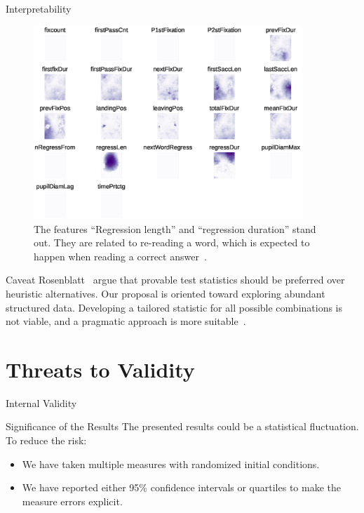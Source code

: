\documentclass[10pt,notes]{beamer}
\begin{document}
\begin{frame}{Interpretability}
    \begin{figure}
        \centering
        \includegraphics[trim=5pt 75pt 5pt 5pt,clip,width=0.9\textwidth]{eye_features.eps}
        \caption{
            The features ``Regression length'' and ``regression duration'' stand out.
            They are related to re-reading a word, which is expected to happen when reading a correct answer~\cite{salojarvi2005inferring}.
        }
    \end{figure}

\end{frame}


\begin{frame}{Caveat}
    Rosenblatt~\cite{rosenblatt2019better} argue that provable test statistics
    should be preferred over heuristic alternatives.
    \smallskip
    Our proposal is oriented toward \alert{exploring} abundant structured data.
    Developing a tailored statistic for all possible combinations is not viable,
    and a pragmatic approach is more suitable~\cite{kim2021classification}.
\end{frame}

\section{Threats to Validity}

\begin{frame}{Internal Validity}
    \begin{alertblock}{Significance of the Results}
        \smallskip
        The presented results could be a statistical fluctuation. To reduce the risk:
        
        \begin{itemize}
            \item We have taken multiple measures with randomized initial conditions.
            \item We have reported either 95\% confidence intervals or quartiles to make the measure errors explicit.
        \end{itemize}
    \end{alertblock}
\end{frame}
\end{document}
